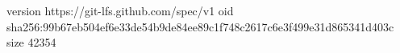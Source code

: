 version https://git-lfs.github.com/spec/v1
oid sha256:99b67eb504ef6e33de54b9de84ee89c1f748c2617c6e3f499e31d865341d403c
size 42354
